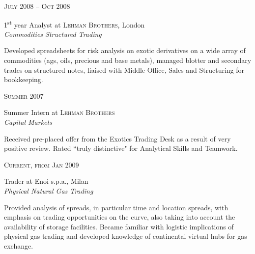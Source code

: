 \documentclass[10pt]{article} %
\begin{document}
{\begin{minipage}[t]{0.5\textwidth}

{\raggedleft\textsc{July 2008 -- Oct 2008}\par}

{\raggedright\large 1\textsuperscript{st} year Analyst at \textsc{Lehman Brothers}, London\\
\textit{Commodities Structured Trading}\\[5pt]}

\normalsize{Developed spreadsheets for risk analysis on exotic derivatives on a wide array of commodities (ags, oils, precious and base metals), managed blotter and secondary trades on structured notes, liaised with Middle Office, Sales and Structuring for bookkeeping.}\\


{\raggedleft\textsc{Summer 2007}\par}

{\raggedright\large Summer Intern at \textsc{Lehman Brothers}\\
\textit{Capital Markets}\\[5pt]}

\normalsize{Received pre-placed offer from the Exotics Trading Desk as a result of very positive review. Rated ``truly distinctive" for Analytical Skills and Teamwork.}\\


{\raggedleft\textsc{Current, from Jan 2009}\par}

{\raggedright\large Trader at Enoi s.p.a., Milan\\
\textit{Physical Natural Gas Trading}\\[5pt]}

\normalsize{Provided analysis of spreads, in particular time and location spreads, with emphasis on trading opportunities on the curve, also taking into account the availability of storage facilities. Became familiar with logistic implications of physical gas trading and developed knowledge of continental virtual hubs for gas exchange.}\\



\end{minipage}}
\end{document}

